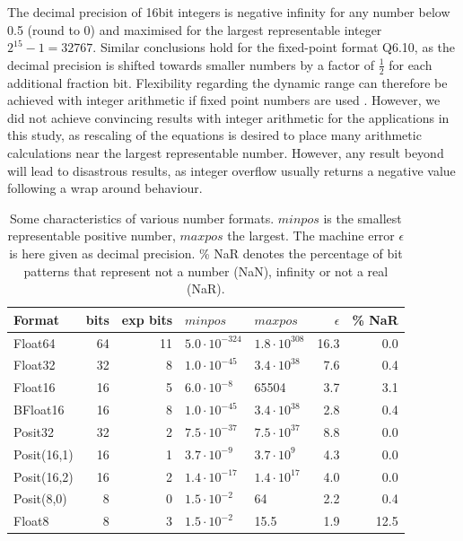 \documentclass[draft]{agujournal2019}
\begin{document}
The decimal precision of 16bit integers is negative infinity for any number below 0.5 (round to 0) and maximised for the largest representable integer $2^{15} - 1 =  32767$. Similar conclusions hold for the fixed-point format Q6.10, as the decimal precision is shifted towards smaller numbers by a factor of $\tfrac{1}{2}$ for each additional fraction bit. Flexibility regarding the dynamic range can therefore be achieved with integer arithmetic if fixed point numbers are used \cite{Russell2017}. However, we did not achieve convincing results with integer arithmetic for the applications in this study, as rescaling of the equations is desired to place many arithmetic calculations near the largest representable number. However, any result beyond will lead to disastrous results, as integer overflow usually returns a negative value following a wrap around behaviour. 

\begin{table}
\center
\begin{tabular}{l | r | r | l | l | r | r}
Format & bits & exp bits & $minpos$ & $maxpos$ & $\epsilon$ &  \% NaR \\
\hline
Float64	& 64 & 11 & $5.0 \cdot 10^{-324}$ & $1.8 \cdot 10^{308}$  & 16.3 & 0.0 \\
Float32	& 32 & 8 & $1.0 \cdot 10^{-45}$ & $3.4 \cdot 10^{38}$ & 7.6 & 0.4 \\
Float16	& 16 & 5 & $6.0 \cdot 10^{-8}$ & 65504 & 3.7 & 3.1 \\
BFloat16	& 16 & 8 & $ 1.0 \cdot 10^{-45}$ & $3.4 \cdot 10^{38}$ & 2.8 & 0.4  \\
Posit32	& 32 & 2 &  $7.5 \cdot 10^{-37}$ & $7.5 \cdot 10^{37}$ & 8.8 & 0.0 \\
Posit(16,1) & 16 & 1 & $3.7 \cdot 10^{-9}$ & $3.7 \cdot 10^{9}$ & 4.3 & 0.0\\
Posit(16,2) & 16 & 2 & $1.4 \cdot 10^{-17}$ & $1.4 \cdot 10^{17}$ & 4.0 & 0.0\\
Posit(8,0) & 8 & 0 & $1.5 \cdot 10^{-2}$ & 64 & 2.2 & 0.4  \\
Float8 & 8 & 3 & $1.5 \cdot 10^{-2}$ & 15.5 & 1.9 &12.5\\
\end{tabular}
\vspace{10pt}
\caption{Some characteristics of various number formats. $minpos$ is the smallest representable positive number, $maxpos$ the largest. The machine error $\epsilon$ is here given as decimal precision. \% NaR denotes the percentage of bit patterns that represent not a number (NaN), infinity or not a real (NaR).}
\label{tab:formats}
\end{table}
\end{document}
